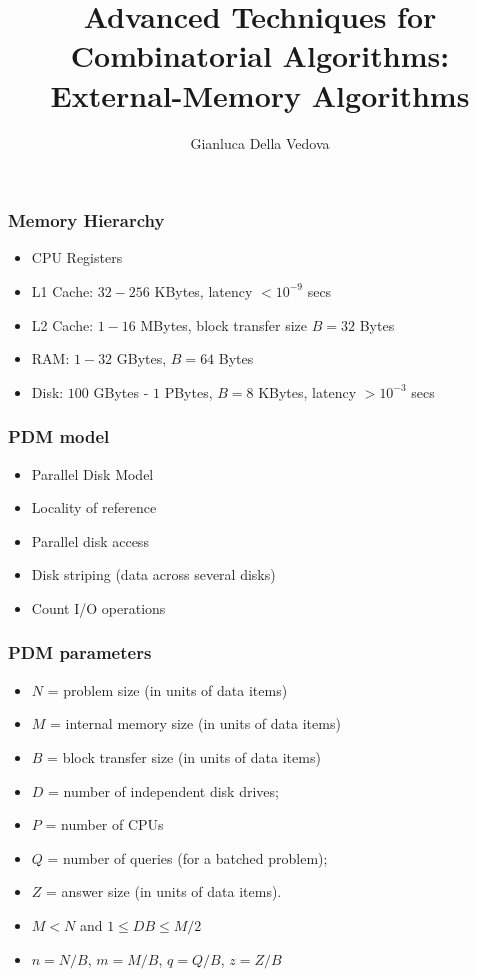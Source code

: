 \documentclass[12pt,aspectratio=169]{beamer}
\author{Gianluca Della Vedova}
\title[Advanced Algorithms]{Advanced Techniques for Combinatorial Algorithms:
External-Memory Algorithms}
\institute[]{Univ. Milano--Bicocca\\
  \texttt{https://gianluca.dellavedova.org}}
\begin{document}
\begin{frame}
  \titlepage
\end{frame}



\begin{frame}\frametitle{Memory Hierarchy}
  \begin{itemize}
  \item
    CPU Registers
  \item
    L1 Cache: $32-256$ KBytes, latency $< 10^{-9}$ secs
  \item
    L2 Cache: $1-16$ MBytes, block transfer size $B=32$ Bytes
  \item
    RAM: $1-32$ GBytes,  $B=64$ Bytes
  \item
    Disk: $100$ GBytes - $1$ PBytes,  $B=8$ KBytes, latency $> 10^{-3}$ secs
  \end{itemize}
\end{frame}


\begin{frame}\frametitle{PDM model}
  \begin{itemize}
  \item
    Parallel Disk Model
  \item
    Locality of reference
  \item
    Parallel disk access
  \item
    Disk striping (data across several disks)
  \item
    Count \alert{I/O operations}
  \end{itemize}
\end{frame}

\begin{frame}\frametitle{PDM parameters}
  \begin{itemize}
  \item
    $N$ = problem size (in units of data items)
  \item
$M$ = internal memory size (in units of data items)
  \item
$B$ = block transfer size (in units of data items)
  \item
$D$ = number of independent disk drives;
  \item
$P$ = number of CPUs
\item
  $Q$ = number of queries (for a batched problem);
  \item
$Z$ = answer size (in units of data items).
  \item
    $M < N$ and $1 \le DB \le M/2$
  \item
    $n=N/B$, $m=M/B$, $q=Q/B$, $z=Z/B$
  \end{itemize}
\end{frame}
\end{document}
